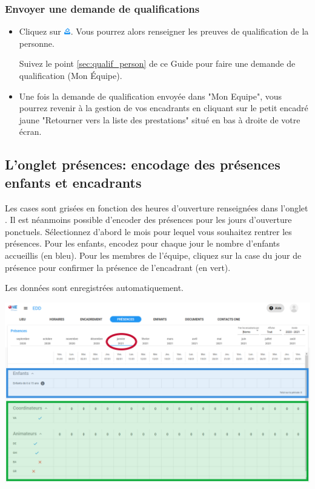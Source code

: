 \subsubsection{Envoyer une demande de qualifications}
\begin{itemize}
    \item Cliquez sur \includegraphics[width=0.3cm]{Images/icon/button_dmd_qualif.png}. Vous pourrez alors renseigner les preuves de qualification de la personne.
        \begin{conseil}
        Suivez le point \ref{sec:qualif_person} de ce Guide pour faire une demande de qualification (Mon Équipe). 
        \end{conseil}
    \item Une fois la demande de qualification envoyée dans "Mon Equipe", vous pourrez revenir à la gestion de vos encadrants en cliquant sur le petit encadré jaune "Retourner vers la liste des prestations" situé en bas à droite de votre écran.
\end{itemize}

\subsection{L'onglet présences: encodage des présences enfants et encadrants}

Les cases sont grisées en fonction des heures d'ouverture renseignées dans l'onglet . Il est néanmoins possible d'encoder des présences pour les jours d'ouverture ponctuels. Sélectionnez d'abord le mois pour lequel vous souhaitez rentrer les présences. Pour les enfants, encodez pour chaque jour le nombre d'enfants accueillis (en bleu). Pour les membres de l'équipe, cliquez sur la case du jour de présence pour confirmer la présence de l'encadrant (en vert). 
\begin{info}
Les données sont enregistrées automatiquement. 
\end{info}

\vspace{1cm}

\centerline{\includegraphics[width=16cm]{Images/edd/edd-presences.png}}

